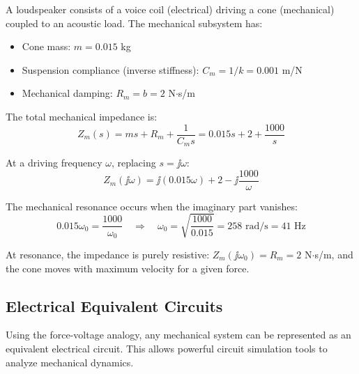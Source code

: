 \begin{examplebox}[title=Example 5.2: Impedance Analysis of a Speaker System]
A loudspeaker consists of a voice coil (electrical) driving a cone (mechanical) coupled to an acoustic load. The mechanical subsystem has:
\begin{itemize}
    \item Cone mass: $m = 0.015$ kg
    \item Suspension compliance (inverse stiffness): $C_m = 1/k = 0.001$ m/N
    \item Mechanical damping: $R_m = b = 2$ N$\cdot$s/m
\end{itemize}

The total mechanical impedance is:
\begin{equation}
Z_m(s) = ms + R_m + \frac{1}{C_m s} = 0.015s + 2 + \frac{1000}{s}
\end{equation}

At a driving frequency $\omega$, replacing $s = \jj\omega$:
\begin{equation}
Z_m(\jj\omega) = \jj(0.015\omega) + 2 - \jj\frac{1000}{\omega}
\end{equation}

The mechanical resonance occurs when the imaginary part vanishes:
\begin{equation}
0.015\omega_0 = \frac{1000}{\omega_0} \quad \Rightarrow \quad \omega_0 = \sqrt{\frac{1000}{0.015}} = 258 \text{ rad/s} = 41 \text{ Hz}
\end{equation}

At resonance, the impedance is purely resistive: $Z_m(\jj\omega_0) = R_m = 2$ N$\cdot$s/m, and the cone moves with maximum velocity for a given force.
\end{examplebox}

\subsection{Electrical Equivalent Circuits}

Using the force-voltage analogy, any mechanical system can be represented as an equivalent electrical circuit. This allows powerful circuit simulation tools to analyze mechanical dynamics.

